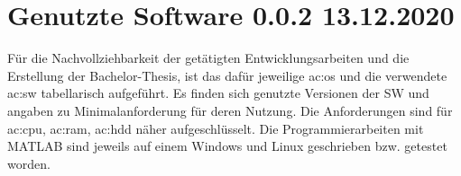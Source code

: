 %
\chapter{Genutzte Software 0.0.2 13.12.2020}

Für die Nachvollziehbarkeit der getätigten Entwicklungsarbeiten und die Erstellung der Bachelor-Thesis, ist das dafür jeweilige \gls{ac:os}
und die verwendete \gls{ac:sw} tabellarisch aufgeführt. Es finden sich genutzte Versionen der SW und angaben zu Minimalanforderung für deren
Nutzung. Die Anforderungen sind für \gls{ac:cpu}, \gls{ac:ram}, \gls{ac:hdd} näher aufgeschlüsselt. Die Programmierarbeiten mit MATLAB sind
jeweils auf einem Windows und Linux geschrieben bzw. getestet worden.

\begin{table}[!htbp]
\centering
{}
\end{table}
